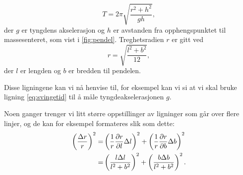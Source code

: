 \begin{equation}
T=2\pi\sqrt{\frac{r^2+h^2}{gh}},
\label{eq:svingetid} %
\end{equation}
der $g$ er tyngdens akselerasjon og $h$ er avstanden fra opphengspunktet til massesenteret, som vist i \autoref{fig:pendel}. Treghetsradien $r$ er gitt ved
\begin{equation}
r=\sqrt{\frac{l^2+b^2}{12}},
\label{eq:treghetsradius}
\end{equation}
der $l$ er lengden og $b$ er bredden til pendelen.


Disse ligningene kan vi nå henvise til, for eksempel kan vi si at vi skal bruke ligning
\eqref{eq:svingetid} til å måle tyngdeakselerasjonen $g$.


Noen ganger trenger vi litt større oppstillinger av ligninger som går over flere linjer, og de kan for eksempel formateres slik som dette:
\begin{align}
\left(\frac{\Delta r}{r}\right)^2=&\left(\frac{1}{r}\frac{\partial r}{\partial l}\Delta l\right)^2+\left(\frac{1}{r}\frac{\partial r}{\partial b}\Delta b\right)^2 \notag \\
=&\left(\frac{l\Delta l}{l^2+b^2}\right)^2+\left(\frac{b\Delta b}{l^2+b^2}\right)^2.
\label{eq:feilforplantning}
\end{align}

